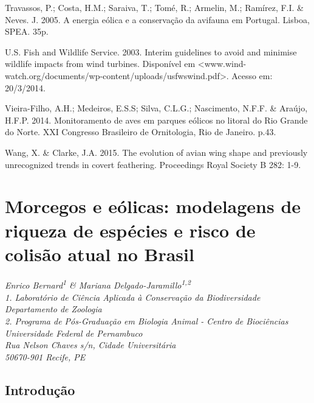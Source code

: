 \documentclass[
]{scrbook}
\begin{document}
Travassos, P.; Costa, H.M.; Saraiva, T.; Tomé, R.; Armelin, M.; Ramírez, F.I. \& Neves. J. 2005. A energia eólica e a conservação da avifauna em Portugal. Lisboa, SPEA. 35p.

U.S. Fish and Wildlife Service. 2003. Interim guidelines to avoid and minimise wildlife impacts from wind turbines. Disponível em \textless www.wind-watch.org/documents/wp-content/uploads/usfwswind.pdf\textgreater. Acesso em: 20/3/2014.

Vieira-Filho, A.H.; Medeiros, E.S.S; Silva, C.L.G.; Nascimento, N.F.F. \& Araújo, H.F.P. 2014. Monitoramento de aves em parques eólicos no litoral do Rio Grande do Norte. XXI Congresso Brasileiro de Ornitologia, Rio de Janeiro. p.43.

Wang, X. \& Clarke, J.A. 2015. The evolution of avian wing shape and previously unrecognized trends in covert feathering. Proceedings Royal Society B 282: 1-9.

\hypertarget{morcegos}{%
\chapter{Morcegos e eólicas: modelagens de riqueza de espécies e risco de colisão atual no Brasil}\label{morcegos}}

\emph{Enrico Bernard\textsuperscript{1} \& Mariana Delgado-Jaramillo\textsuperscript{1,2}}\\
\emph{1. Laboratório de Ciência Aplicada à Conservação da Biodiversidade Departamento de Zoologia}\\
\emph{2. Programa de Pós-Graduação em Biologia Animal - Centro de Biociências}\\
\emph{Universidade Federal de Pernambuco}\\
\emph{Rua Nelson Chaves s/n, Cidade Universitária}\\
\emph{50670-901 Recife, PE}

\hypertarget{introducao}{%
\section{Introdução}\label{introducao}}
\end{document}
